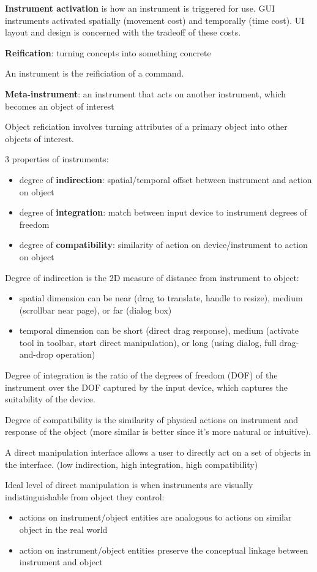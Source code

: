\documentclass[11pt]{article}
\begin{document}
\textbf{Instrument activation} is how an instrument is triggered for use.
GUI instruments activated spatially (movement cost) and temporally (time cost).
UI layout and design is concerned with the tradeoff of these costs.

\textbf{Reification}: turning concepts into something concrete

An instrument is the reificiation of a command.

\textbf{Meta-instrument}: an instrument that acts on another instrument, which becomes an object
of interest

Object reficiation involves turning attributes of a primary object into other objects of
interest.

3 properties of instruments:
\begin{itemize}
\item degree of \textbf{indirection}: spatial/temporal offset between instrument and action on object
\item degree of \textbf{integration}: match between input device to instrument degrees of freedom
\item degree of \textbf{compatibility}: similarity of action on device/instrument to action on object
\end{itemize}

Degree of indirection is the 2D measure of distance from instrument to object:
\begin{itemize}
\item spatial dimension can be near (drag to translate, handle to resize), medium
(scrollbar near page), or far (dialog box)
\item temporal dimension can be short (direct drag response), medium (activate tool in toolbar,
start direct manipulation), or long (using dialog, full drag-and-drop operation)
\end{itemize}

Degree of integration is the ratio of the degrees of freedom (DOF) of the instrument over
the DOF captured by the input device, which captures the suitability of the device.

Degree of compatibility is the similarity of physical actions on instrument and response
of the object (more similar is better since it's more natural or intuitive).

A direct manipulation interface allows a user to directly act on a set of objects in the
interface. (low indirection, high integration, high compatibility)

Ideal level of direct manipulation is when instruments are visually indistinguishable from
object they control:
\begin{itemize}
\item actions on instrument/object entities are analogous to actions on similar object in the
real world
\item action on instrument/object entities preserve the conceptual linkage between instrument
and object
\end{itemize}
\end{document}
